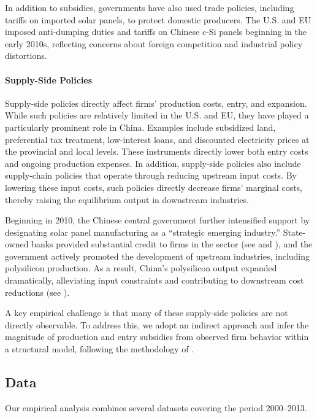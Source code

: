 \documentclass[12pt]{article}
\begin{document}
In addition to subsidies, governments have also used trade policies, including tariffs on imported solar panels, to protect domestic producers. The U.S. and EU imposed anti-dumping duties and tariffs on Chinese c-Si panels beginning in the early 2010s, reflecting concerns about foreign competition and industrial policy distortions.


\paragraph{Supply-Side Policies} 

Supply-side policies directly affect firms’ production costs, entry, and expansion. While such policies are relatively limited in the U.S. and EU, they have played a particularly prominent role in China. Examples include subsidized land, preferential tax treatment, low-interest loans, and discounted electricity prices at the provincial and local levels. These instruments directly lower both entry costs and ongoing production expenses. In addition, supply-side policies also include supply-chain policies that operate through reducing upstream input costs. By lowering these input costs, such policies directly decrease firms’ marginal costs, thereby raising the equilibrium output in downstream industries.

Beginning in 2010, the Chinese central government further intensified support by designating solar panel manufacturing as a “strategic emerging industry.” State-owned banks provided substantial credit to firms in the sector (see \cite{lexology2010strategic} and \cite{nahm2023state}), and the government actively promoted the development of upstream industries, including polysilicon production. As a result, China’s polysilicon output expanded dramatically, alleviating input constraints and contributing to downstream cost reductions (see \cite{waferpro_2024_china_silicon_supply}).

A key empirical challenge is that many of these supply-side policies are not directly observable. To address this, we adopt an indirect approach and infer the magnitude of production and entry subsidies from observed firm behavior within a structural model, following the methodology of \citet{barwick2025industrial}.

\subsection{Data}
\label{subsec:inst_data}

Our empirical analysis combines several datasets covering the period 2000–2013.
\end{document}
